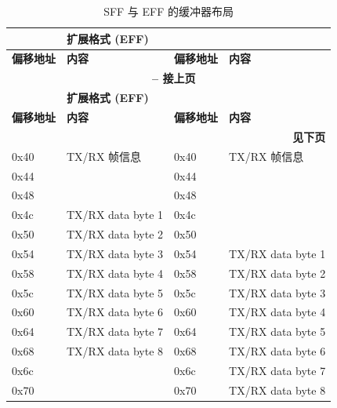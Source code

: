 \begin{longtable}[c]{|p{2.5cm}|p{4cm}|p{2.5cm}|p{4cm}|}
\caption{SFF 与 EFF 的缓冲器布局}\label{tab:twai-buffer-layout-std-extended-frame-format}
\\\hline
    \rowcolor{lightgray}
        \multicolumn{2}{|l|}{\textbf{标准格式 (SFF)}} &\multicolumn{2}{|l|}{\textbf{扩展格式 (EFF)}} \\\hline
    \rowcolor{gray!25}
        \textbf{偏移地址} & \textbf{内容} & \textbf{偏移地址} & \textbf{内容}\\\hline
    \endfirsthead
    
    \multicolumn{4}{c}{\bfseries \tablename\ \thetable{} -- 接上页}\\\hline
    
    \rowcolor{lightgray}
        \multicolumn{2}{|l|}{\textbf{标准格式 (SFF)}} &\multicolumn{2}{|l|}{\textbf{扩展格式 (EFF)}} \\\hline
    \rowcolor{gray!25}
        \textbf{偏移地址} & \textbf{内容} & \textbf{偏移地址} & \textbf{内容}\\\hline
    \endhead
    \multicolumn{4}{r}{\textbf{见下页}} \\
    \endfoot
    \endlastfoot
    
0x40&TX/RX 帧信息 &0x40&TX/RX 帧信息\\\hline
0x44&\cellcolor{mycyan}{TX/RX identifier 1}&0x44&\cellcolor{mycyan}{TX/RX identifier 1}\\\hline
0x48&\cellcolor{mycyan}{TX/RX identifier 2}&0x48&\cellcolor{mycyan}{TX/RX identifier 2}\\\hline
0x4c&TX/RX data byte 1&0x4c&\cellcolor{mycyan}{TX/RX identifier 3}\\\hline
0x50&TX/RX data byte 2&0x50&\cellcolor{mycyan}{TX/RX identifier 4}\\\hline
0x54&TX/RX data byte 3&0x54&TX/RX data byte 1\\\hline
0x58&TX/RX data byte 4&0x58&TX/RX data byte 2\\\hline
0x5c&TX/RX data byte 5&0x5c&TX/RX data byte 3\\\hline
0x60&TX/RX data byte 6&0x60&TX/RX data byte 4\\\hline
0x64&TX/RX data byte 7&0x64&TX/RX data byte 5\\\hline
0x68&TX/RX data byte 8&0x68&TX/RX data byte 6\\\hline
0x6c&\cellcolor{yellow}{保留}&0x6c&TX/RX data byte 7\\\hline
0x70&\cellcolor{yellow}{保留}&0x70&TX/RX data byte 8\\\hline
\end{longtable}
